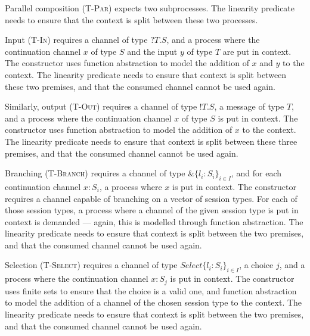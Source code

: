 \documentclass{mproj}
\newcommand{\Send}[1]{!#1.}
\newcommand{\Recv}[1]{?#1.}
\newcommand{\Branch}{\&}
\begin{document}

Parallel composition (\textsc{T-Par}) expects two subprocesses. The linearity predicate needs to ensure that the context is split between these two processes.


Input (\textsc{T-In}) requires a channel of type $\Recv{T}S$, and a process where the continuation channel $x$ of type $S$ and the input $y$ of type $T$ are put in context. The  constructor uses function abstraction to model the addition of $x$ and $y$ to the context. The linearity predicate needs to ensure that context is split between these two premises, and that the consumed channel cannot be used again.


Similarly, output (\textsc{T-Out}) requires a channel of type $\Send{T}S$, a message of type $T$, and a process where the continuation channel $x$ of type $S$ is put in context. The  constructor uses function abstraction to model the addition of $x$ to the context. The linearity predicate needs to ensure that context is split between these three premises, and that the consumed channel cannot be used again.


Branching (\textsc{T-Branch}) requires a channel of type $\Branch \{l_i : S_i\}_{i \in I}$, and for each continuation channel $x : S_i$, a process where $x$ is put in context. The  constructor requires a channel capable of branching on a vector of session types. For each of those session types, a process where a channel of the given session type is put in context is demanded --- again, this is modelled through function abstraction. The linearity predicate needs to ensure that context is split between the two premises, and that the consumed channel cannot be used again.


Selection (\textsc{T-Select}) requires a channel of type $Select \{l_i : S_i\}_{i \in I}$, a choice $j$, and a process where the continuation channel $x : S_j$ is put in context. The  constructor uses finite sets to ensure that the choice is a valid one, and function abstraction to model the addition of a channel of the chosen session type to the context. The linearity predicate needs to ensure that context is split between the two premises, and that the consumed channel cannot be used again.
\end{document}
